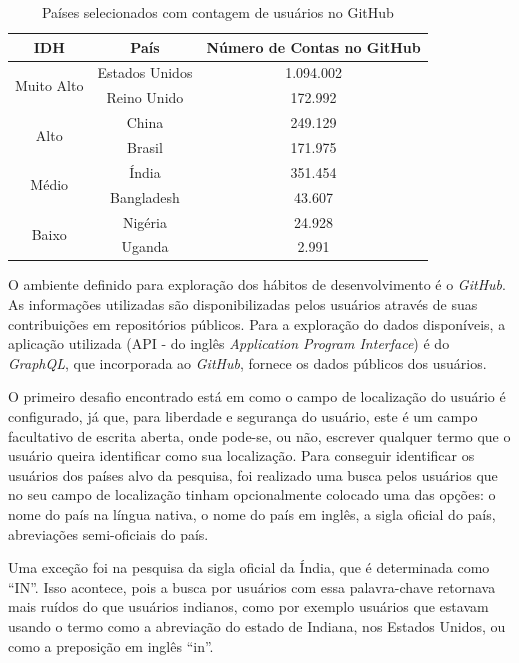 \documentclass[12pt]{article}
\begin{document}
\begin{table}[ht]
\centering
\caption{Países selecionados com contagem de usuários no GitHub}
\begin{tabular}{|c|c|c|}
\hline
IDH                         & País           & Número de Contas no GitHub \\ \hline
\multirow{2}{*}{Muito Alto} & Estados Unidos & 1.094.002                  \\ \cline{2-3} 
                            & Reino Unido    & 172.992                    \\ \hline
\multirow{2}{*}{Alto}       & China          & 249.129                    \\ \cline{2-3} 
                            & Brasil         & 171.975                    \\ \hline
\multirow{2}{*}{Médio}      & Índia          & 351.454                    \\ \cline{2-3} 
                            & Bangladesh     & 43.607                     \\ \hline
\multirow{2}{*}{Baixo}      & Nigéria        & 24.928                     \\ \cline{2-3} 
                            & Uganda         & 2.991                      \\ \hline
\end{tabular}
\end{table}

O ambiente definido para exploração dos hábitos de desenvolvimento  é o \textit{GitHub}. As informações utilizadas são disponibilizadas pelos usuários através de suas contribuições em repositórios públicos. Para a exploração do dados disponíveis, a aplicação utilizada (API - do inglês \textit{Application Program Interface}) é do \textit{GraphQL}, que incorporada ao \textit{GitHub}, fornece os dados públicos dos usuários.

O primeiro desafio encontrado está em como o campo de localização do usuário é configurado, já que, para liberdade e segurança do usuário, este é um campo facultativo de escrita aberta, onde pode-se, ou não, escrever qualquer termo que o usuário queira identificar como sua localização. Para conseguir identificar os usuários dos países alvo da pesquisa, foi realizado uma busca pelos usuários que no seu campo de localização tinham opcionalmente colocado uma das opções: o nome do país na língua nativa, o nome do país em inglês, a sigla oficial do país, abreviações semi-oficiais do país.

Uma exceção foi na pesquisa da sigla oficial da Índia, que é determinada como ``IN''. Isso acontece, pois a busca por usuários com essa palavra-chave retornava mais ruídos do que usuários indianos, como por exemplo usuários que estavam usando o termo como a abreviação do estado de Indiana, nos Estados Unidos, ou como a preposição em inglês ``in''.
\end{document}
